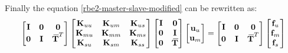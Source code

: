 \documentclass[10pt,b5paper,titlepage]{book}
\newcommand{\m}{\mathbf}
\newcommand{\closure}[2][3]{%
{}\mkern#1mu\overline{\mkern-#1mu#2}}
\begin{document}
Finally the equation \eqref{rbe2-master-slave-modified} can be rewritten as:
\begin{equation}
    \begin{bmatrix}
        \m{I} & \m{0} & \m{0} \\
        \m{0} & \m{I} & \m{\closure{T}}^T \\
    \end{bmatrix}
    \begin{bmatrix}
        \m{K}_{uu} & \m{K}_{um} & \m{K}_{us} \\
        \m{K}_{mu} & \m{K}_{mm} & \m{K}_{ms} \\
        \m{K}_{su} & \m{K}_{sm} & \m{K}_{ss} \\
    \end{bmatrix}
    \begin{bmatrix}
        \m{I} & \m{0} \\
        \m{0} & \m{I} \\
        \m{0} & \m{\closure{T}} \\
    \end{bmatrix}
    \begin{bmatrix}
        \m{u}_u \\
        \m{u}_m \\
    \end{bmatrix}
    = \begin{bmatrix}
        \m{I} & \m{0} & \m{0} \\
        \m{0} & \m{I} & \m{\closure{T}}^T \\
    \end{bmatrix}
    \begin{bmatrix}
        \m{f}_u \\
        \m{f}_m \\
        \m{f}_s \\
    \end{bmatrix}
\end{equation}
\end{document}
